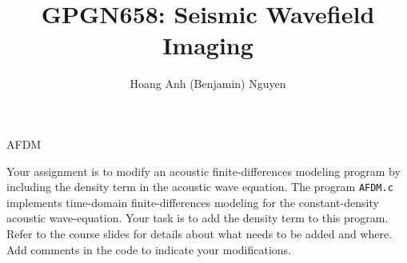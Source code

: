 \author{Hoang Anh (Benjamin) Nguyen}
\title{GPGN658: Seismic Wavefield Imaging}{AFDM}

Your assignment is to modify an acoustic finite-differences modeling
program by including the density term in the acoustic wave equation.
The program \texttt{AFDM.c} implements time-domain finite-differences
modeling for the constant-density acoustic wave-equation. Your task is
to add the density term to this program. Refer to the course slides
for details about what needs to be added and where. Add comments in
the code to indicate your modifications.






%


